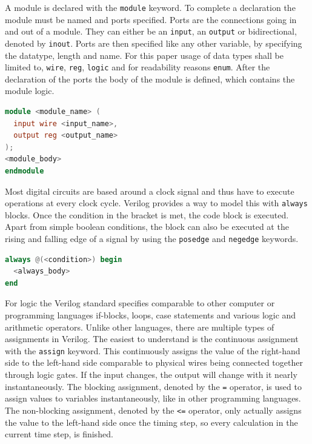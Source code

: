 A module is declared with the \texttt{module} keyword. To complete a declaration the module must be named and ports specified. Ports are the connections going in and out of a module. They can either be an \texttt{input}, an \texttt{output} or bidirectional, denoted by \texttt{inout}. Ports are then specified like any other variable, by specifying the datatype, length and name. For this paper usage of data types shall be limited to, \texttt{wire}, \texttt{reg}, \texttt{logic} and for readability reasons \texttt{enum}. After the declaration of the ports the body of the module is defined, which contains the module logic.
\begin{lstlisting}[language=Verilog, caption=Module definition]
module <module_name> (
  input wire <input_name>,
  output reg <output_name>
);
<module_body>
endmodule
\end{lstlisting}


Most digital circuits are based around a clock signal and thus have to execute operations at every clock cycle. Verilog provides a way to model this with \texttt{always} blocks. Once the condition in the bracket is met, the code block is executed. Apart from simple boolean conditions, the block can also be executed at the rising and falling edge of a signal by using the \texttt{posedge} and \texttt{negedge} keywords.

\begin{lstlisting}[language=Verilog, caption=Always block definition]
always @(<condition>) begin
  <always_body>
end

\end{lstlisting}

For logic the Verilog standard specifies comparable to other computer or programming languages if-blocks, loops, case statements and various logic and arithmetic operators. Unlike other languages, there are multiple types of assignments in Verilog. The easiest to understand is the continuous assignment with the \texttt{assign} keyword. This continuously assigns the value of the right-hand side to the left-hand side comparable to physical wires being connected together through logic gates. If the input changes, the output will change with it nearly instantaneously. The blocking assignment, denoted by the \texttt{=} operator, is used to assign values to variables instantaneously, like in other programming languages. The non-blocking assignment, denoted by the \texttt{<=} operator, only actually assigns the value to the left-hand side once the timing step, so every calculation in the current time step, is finished. 


